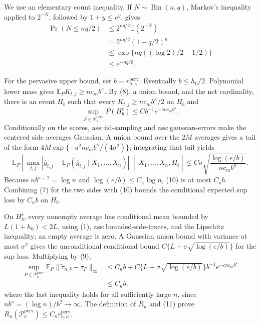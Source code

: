 We use an elementary count inequality.  If \(N\sim\operatorname{Bin}(n,q)\), Markov's inequality applied to \(2^{-N}\), followed by \(1+y\le e^y\), gives
\[
 \begin{aligned}
 \Pr(N\le nq/2)
 &\le 2^{nq/2}\mathbb E(2^{-N})\\
 &=2^{nq/2}(1-q/2)^n\\
 &\le\exp\{nq((\log2)/2-1/2)\}\\
 &\le e^{-nq/8}. \tag{8}
 \end{aligned}
\]

For the pervasive upper bound, set \(b=r_{n,\kappa}^{\mathrm{perv}}\).  Eventually \(b\le h_0/2\).  Polynomial lower mass gives \(\mathbb E_PK_{t,j}\ge nc_mb^\kappa\).  By (8), a union bound, and the net cardinality, there is an event \(H_b\) such that every \(K_{t,j}\ge nc_mb^\kappa/2\) on \(H_b\) and
\[
 \sup_{P\in\mathcal P_\kappa^{\mathrm{perv}}}P(H_b^c)
 \le Cb^{-1}e^{-c n c_mb^\kappa}. \tag{9}
\]
Conditionally on the scores, \(\mathrm{ass:iid\text{-}sampling}\) and \(\mathrm{ass:gaussian\text{-}errors}\) make the centered side averages Gaussian.  A union bound over the \(2M\) averages gives a tail of the form \(4M\exp\{-u^2nc_mb^\kappa/(4\sigma^2)\}\); integrating that tail yields
\[
 \mathbb E_P\left[
 \max_{t,j}|\overline g_{t,j}-\mathbb E_P(\overline g_{t,j}\mid X_1,\ldots,X_n)|
 \ \middle|\ X_1,\ldots,X_n,H_b\right]
 \le C\sigma\sqrt{\frac{\log(e/b)}{nc_mb^\kappa}}. \tag{10}
\]
Because \(nb^{\kappa+2}=\log n\) and \(\log(e/b)\le C_\kappa\log n\), (10) is at most \(C_\kappa b\).  Combining (7) for the two sides with (10) bounds the conditional expected sup loss by \(C_\kappa b\) on \(H_b\).

On \(H_b^c\), every nonempty average has conditional mean bounded by \(L(1+h_0)<2L\), using (1), \(\mathrm{ass:bounded\text{-}side\text{-}traces}\), and the Lipschitz inequality; an empty average is zero.  A Gaussian union bound with variance at most \(\sigma^2\) gives the unconditional conditional bound \(C\{L+\sigma\sqrt{\log(e/b)}\}\) for the sup loss.  Multiplying by (9),
\[
 \begin{aligned}
 \sup_{P\in\mathcal P_\kappa^{\mathrm{perv}}}
 \mathbb E_P\|\widetilde\tau_{n,b}-\tau_P\|_\infty
 &\le C_\kappa b
 +C\{L+\sigma\sqrt{\log(e/b)}\}b^{-1}e^{-c n c_mb^\kappa}\\
 &\le C_\kappa b, \tag{11}
 \end{aligned}
\]
where the last inequality holds for all sufficiently large \(n\), since \(nb^\kappa=(\log n)/b^2\to\infty\).  The definition of \(R_n\) and (11) prove \(R_n(\mathcal P_\kappa^{\mathrm{perv}})\le C_\kappa r_{n,\kappa}^{\mathrm{perv}}\).

